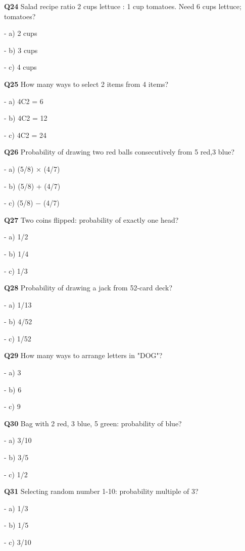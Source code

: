 \textbf{Q24} Salad recipe ratio 2 cups lettuce : 1 cup tomatoes. Need 6 cups lettuce; tomatoes?\par
\quad - a) 2 cups\par
\quad - b) 3 cups\par
\quad - c) 4 cups\par

\textbf{Q25} How many ways to select 2 items from 4 items?\par
\quad - a) 4C2 = 6\par
\quad - b) 4C2 = 12\par
\quad - c) 4C2 = 24\par

\textbf{Q26} Probability of drawing two red balls consecutively from 5 red,3 blue?\par
\quad - a) (5/8) × (4/7)\par
\quad - b) (5/8) + (4/7)\par
\quad - c) (5/8) − (4/7)\par

\textbf{Q27} Two coins flipped: probability of exactly one head?\par
\quad - a) 1/2\par
\quad - b) 1/4\par
\quad - c) 1/3\par

\textbf{Q28} Probability of drawing a jack from 52-card deck?\par
\quad - a) 1/13\par
\quad - b) 4/52\par
\quad - c) 1/52\par

\textbf{Q29} How many ways to arrange letters in "DOG"?\par
\quad - a) 3\par
\quad - b) 6\par
\quad - c) 9\par

\textbf{Q30} Bag with 2 red, 3 blue, 5 green: probability of blue?\par
\quad - a) 3/10\par
\quad - b) 3/5\par
\quad - c) 1/2\par

\textbf{Q31} Selecting random number 1-10: probability multiple of 3?\par
\quad - a) 1/3\par
\quad - b) 1/5\par
\quad - c) 3/10\par

